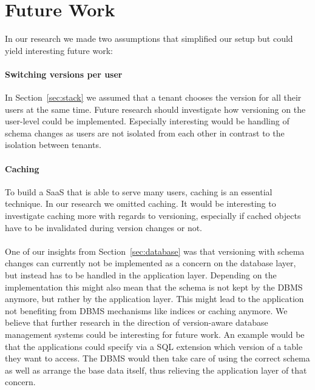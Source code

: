 
\section{Future Work}
\label{sec:futurework}

In our research we made two assumptions that simplified our setup but could yield interesting future work:

\paragraph{Switching versions per user} In Section~\ref{sec:stack} we assumed that a tenant chooses the version for all their users at the same time. Future research should investigate how versioning on the user-level could be implemented. Especially interesting would be handling of schema changes as users are not isolated from each other in contrast to the isolation between tenants.

\paragraph{Caching} To build a SaaS that is able to serve many users, caching is an essential technique. In our research we omitted caching. It would be interesting to investigate caching more with regards to versioning, especially if cached objects have to be invalidated during version changes or not.

\paragraph{} One of our insights from Section~\ref{sec:database} was that versioning with schema changes can currently not be implemented as a concern on the database layer, but instead has to be handled in the application layer. Depending on the implementation this might also mean that the schema is not kept by the DBMS anymore, but rather by the application layer. This might lead to the application not benefiting from DBMS mechanisms like indices or caching anymore. We believe that further research in the direction of version-aware database management systems could be interesting for future work. An example would be that the applications could specify via a SQL extension which version of a table they want to access. The DBMS would then take care of using the correct schema as well as arrange the base data itself, thus relieving the application layer of that concern.
